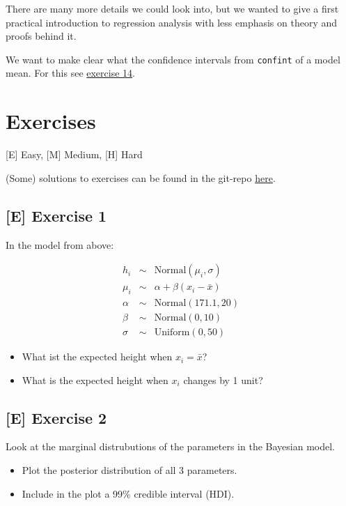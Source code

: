 \documentclass[
]{book}
\providecommand{\tightlist}{%
  \setlength{\itemsep}{0pt}\setlength{\parskip}{0pt}}
\begin{document}
There are many more details we could look into, but we wanted to give a first
practical introduction to regression analysis with less emphasis on theory and proofs behind it.

We want to make clear what the confidence intervals from \texttt{confint} of a model mean. For this see
\hyperref[exercise14_simpl_lin_reg]{exercise 14}.

\section{Exercises}\label{exercises-1}

{[}E{]} Easy, {[}M{]} Medium, {[}H{]} Hard

(Some) solutions to exercises can be found in the git-repo \href{https://github.com/jdegenfellner/Script_QM2_ZHAW/tree/main/Solutions_Exercises}{here}.

\subsection{{[}E{]} Exercise 1}\label{exercise1_simpl_lin_reg}

In the model from above:

\begin{eqnarray*}
h_i &\sim& \text{Normal}(\mu_i, \sigma)\\
\mu_i &\sim& \alpha + \beta (x_i - \bar{x})\\
\alpha &\sim& \text{Normal}(171.1, 20)\\
\beta &\sim& \text{Normal}(0, 10)\\
\sigma &\sim& \text{Uniform}(0, 50)
\end{eqnarray*}

\begin{itemize}
\tightlist
\item
  What ist the expected height when \(x_i = \bar{x}\)?
\item
  What is the expected height when \(x_i\) changes by 1 unit?
\end{itemize}

\subsection{{[}E{]} Exercise 2}\label{exercise2_simpl_lin_reg}

Look at the marginal distrubutions of the parameters in the Bayesian model.

\begin{itemize}
\tightlist
\item
  Plot the posterior distribution of all 3 parameters.
\item
  Include in the plot a 99\% credible interval (HDI).
\end{itemize}
\end{document}
